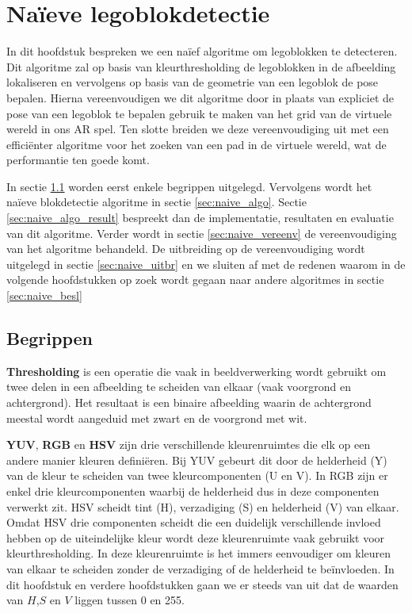 \chapter{Na\"ieve legoblokdetectie}
\label{hoofdstuk:2}
In dit hoofdstuk bespreken we een na\"ief algoritme om legoblokken te detecteren. Dit algoritme zal op basis van kleurthresholding de legoblokken in de afbeelding lokaliseren en vervolgens op basis van de geometrie van een legoblok de pose bepalen. Hierna vereenvoudigen we dit algoritme door in plaats van expliciet de pose van een legoblok te bepalen gebruik te maken van het grid van de virtuele wereld in ons AR spel. Ten slotte breiden we deze vereenvoudiging uit met een effici\"enter algoritme voor het zoeken van een pad in de virtuele wereld, wat de performantie ten goede komt.

In sectie \ref{sec:naive_begr} worden eerst enkele begrippen uitgelegd. Vervolgens wordt het na\"ieve blokdetectie algoritme in sectie \ref{sec:naive_algo}. Sectie \ref{sec:naive_algo_result} bespreekt dan de implementatie, resultaten en evaluatie van dit algoritme. Verder wordt in sectie \ref{sec:naive_vereenv} de vereenvoudiging van het algoritme behandeld. De uitbreiding op de vereenvoudiging wordt uitgelegd in sectie \ref{sec:naive_uitbr} en we sluiten af met de redenen waarom in de volgende hoofdstukken op zoek wordt gegaan naar andere algoritmes in sectie \ref{sec:naive_besl}

\section{Begrippen} \label{sec:naive_begr}

\textbf{Thresholding} is een operatie die vaak in beeldverwerking wordt gebruikt om twee delen in een afbeelding te scheiden van elkaar (vaak voorgrond en achtergrond). Het resultaat is een binaire afbeelding waarin de achtergrond meestal wordt aangeduid met zwart en de voorgrond met wit.

\textbf{YUV}, \textbf{RGB} en \textbf{HSV} zijn drie verschillende kleurenruimtes die elk op een andere manier kleuren defini\"eren. Bij YUV gebeurt dit door de helderheid (Y) van de kleur te scheiden van twee kleurcomponenten (U en V). In RGB zijn er enkel drie kleurcomponenten waarbij de helderheid dus in deze componenten verwerkt zit. HSV scheidt tint (H), verzadiging (S) en helderheid (V) van elkaar. Omdat HSV drie componenten scheidt die een duidelijk verschillende invloed hebben op de uiteindelijke kleur wordt deze kleurenruimte vaak gebruikt voor kleurthresholding. In deze kleurenruimte is het immers eenvoudiger om kleuren van elkaar te scheiden zonder de verzadiging of de helderheid te be\"invloeden. In dit hoofdstuk en verdere hoofdstukken gaan we er steeds van uit dat de waarden van $H$,$S$ en $V$ liggen tussen 0 en 255.

